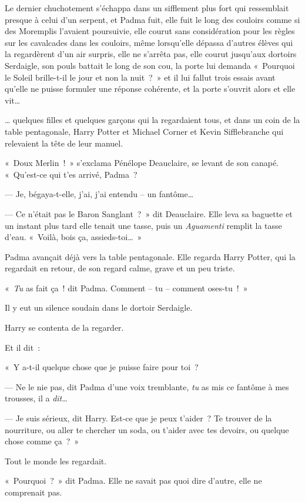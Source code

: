 Le dernier chuchotement s'échappa dans un sifflement plus fort qui ressemblait presque à celui d'un serpent, et Padma fuit, elle fuit le long des couloirs comme si des Moremplis l'avaient poursuivie, elle courut sans considération pour les règles sur les cavalcades dans les couloirs, même lorsqu'elle dépassa d'autres élèves qui la regardèrent d'un air surpris, elle ne s'arrêta pas, elle courut jusqu'aux dortoirs Serdaigle, son pouls battait le long de son cou, la porte lui demanda «~Pourquoi le Soleil brille-t-il le jour et non la nuit~?~»
et il lui fallut trois essais avant qu'elle ne puisse formuler une réponse cohérente, et la porte s'ouvrit alors et elle vit…

… quelques filles et quelques garçons qui la regardaient tous, et dans un coin de la table pentagonale, Harry Potter et Michael Corner et Kevin Sifflebranche qui relevaient la tête de leur manuel.

«~Doux Merlin~!~»
s'exclama Pénélope Deauclaire, se levant de son canapé.
«~Qu'est-ce qui t'es arrivé, Padma~?

--- Je, bégaya-t-elle, j'ai, j'ai entendu -- un fantôme…

--- Ce n'était pas le Baron Sanglant~?~»
dit Deauclaire.
Elle leva sa baguette et un instant plus tard elle tenait une tasse, puis un \emph{Aguamenti} remplit la tasse d'eau.
«~Voilà, bois ça, assieds-toi…~»

Padma avançait déjà vers la table pentagonale.
Elle regarda Harry Potter, qui la regardait en retour, de son regard calme, grave et un peu triste.

«~\emph{Tu} as fait ça~! dit Padma.
Comment -- tu -- comment oses-tu~!~»

Il y eut un silence soudain dans le dortoir Serdaigle.

Harry se contenta de la regarder.

Et il dit~:

«~Y a-t-il quelque chose que je puisse faire pour toi~?

--- Ne le nie pas, dit Padma d'une voix tremblante, \emph{tu} as mis ce fantôme à mes trousses, il a \emph{dit}…

--- Je suis sérieux, dit Harry.
Est-ce que je peux t'aider~?
Te trouver de la nourriture, ou aller te chercher un soda, ou t'aider avec tes devoirs, ou quelque chose comme ça~?~»

Tout le monde les regardait.

«~Pourquoi~?~»
dit Padma.
Elle ne savait pas quoi dire d'autre, elle ne comprenait pas.

